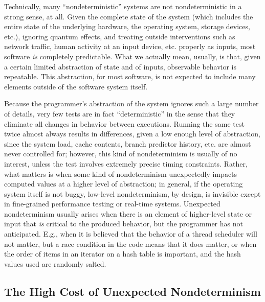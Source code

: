Technically, many ``nondeterministic'' systems are not
nondeterministic in a strong sense, at all.  Given the complete state
of the system (which includes the entire state of the underlying
hardware, the operating system, storage devices, etc.), ignoring
quantum effects, and treating outside interventions such as network
traffic, human activity at an input device, etc. properly as inputs,
most software \emph{is} completely predictable.  What we actually
mean, usually, is that, given a certain limited abstraction of state
and of inputs, observable behavior is repeatable.  This abstraction,
for most software, is not expected to include many elements outside of
the software system itself.

Because the
programmer's abstraction of the system ignores  such a large number of
details, very few tests are in fact ``deterministic'' in the sense
that they eliminate all changes in behavior between executions.  Running the same test
twice almost always results in differences, given a low enough level of
abstraction, since the system load,
cache contents, branch predictor history, etc. are almost never
controlled for; however, this kind of
nondeterminism is usually of no interest, unless the test involves
extremely precise timing constraints.  Rather, what matters is when
some kind of nondeterminism unexpectedly impacts computed values at a
higher level of abstraction; in general, if the operating system
itself is not buggy, low-level nondeterminism, by design, is invisible
except in fine-grained performance testing or real-time systems.
Unexpected nondeterminism usually arises when there is an element of higher-level
state or input that \emph{is} critical to the produced behavior, but
the programmer has not anticipated.  E.g.,  when it is believed that the
behavior of a thread scheduler will not matter, but a race condition
in the code means that it does matter, or when the order of items in
an iterator on a hash table is important, and the hash values used are
randomly salted.

\subsection{The High Cost of Unexpected Nondeterminism}

